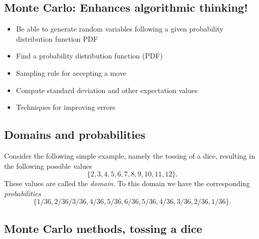 \documentclass[%
oneside,                 %
final,                   %
10pt]{article}
\newenvironment{block_mdfboxadmon}[1][]{
\begin{block_mdfboxmdframed}[frametitle=#1]
}
{
\end{block_mdfboxmdframed}
}
\begin{document}
\subsection{Monte Carlo: Enhances algorithmic thinking!}

\begin{block_mdfboxadmon}[]
\begin{itemize}
\item Be able to generate random variables following a given probability distribution function PDF

\item Find a probability distribution function (PDF)

\item Sampling rule for accepting a move

\item Compute standard deviation and other expectation values

\item Techniques for improving errors
\end{itemize}

\noindent
\end{block_mdfboxadmon} %



\subsection{Domains and probabilities}

\begin{block_mdfboxadmon}[]
Consider the following simple example, namely the tossing of a dice, resulting in  the following possible values
\begin{equation*}
\{2,3,4,5,6,7,8,9,10,11,12\}. 
\end{equation*}
These values are called the \emph{domain}. 
To this domain we have the corresponding \emph{probabilities}
\begin{equation*}
\{1/36,2/36/3/36,4/36,5/36,6/36,5/36,4/36,3/36,2/36,1/36\}.
\end{equation*}
\end{block_mdfboxadmon} %



\subsection{Monte Carlo methods, tossing a dice}
\end{document}
